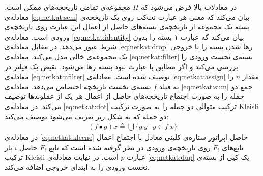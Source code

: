 \documentclass[
msc,
irfonts
]{./tex/tehran-thesis}
\newcommand{\پ}{پروژه/پایان‌نامه/رساله }
\theoremstyle{definition}
\theoremstyle{theorem}
\theoremstyle{definition}
\numberwithin{algorithm}{chapter}
\newcommand{\s}[1]{\{#1\}}
\newcommand{\lf}[1]{\LTRfootnote{#1}}
\begin{document}
در معادلات بالا فرض می‌شود که
$H$
مجموعه‌ی تمامی تاریخچه‌های ممکن است.
معادله‌ی
\ref{eq:netkat:sem}
بیان می‌کند که معنی هر عبارت نت‌کت روی یک تاریخچه‌ی بسته یک مجموعه از
تاریخچه‌ی بسته‌های حاصل از اعمال این عبارت روی تاریخچه‌ی ورودی است.
معادله‌ی
\ref{eq:netkat:identity}
بیان می‌کند که عبارت ۱ بسته را بدون شرط عبور می‌دهد.
در مقابل معادله‌ی
\ref{eq:netkat:drop}
رها شدن بسته را با خروجی یک مجموعه‌ی خالی مدل می‌کند.
معادله‌ی
\ref{eq:netkat:filter}
بسته‌ی نخست ورودی را بررسی می‌کند و اگر مطابق با عبارت نبود بسته رها می‌شود.
نقیض یک فیلتر در معادله‌ی
\ref{eq:netkat:nfilter}
توصیف شده است.
معادله‌ی
\ref{eq:netkat:assign}
مقدار
$n$
را به فیلد
$f$
بسته‌ی نخست تاریخچه اختصاص می‌دهد.
معادله‌ی
\ref{eq:netkat:sum}
جمع دو جمله را به صورت اجتماع تاریخچه‌های حاصل از اعمال هر یک از عملوند‌ها توصیف می‌کند.
در معادله‌ی
\ref{eq:netkat:dot}
ترکیب متوالی دو جمله را به صورت ترکیب
Kleisli
دو جمله که به شکل زیر تعریف می‌شود توصیف می‌کند:
\begin{align*}
    (f \bullet g) x \triangleq \bigcup \s{g\ y ~|~ y \in f\ x}
\end{align*}
در معادله‌ی
\ref{eq:netkat:kleene}
حاصل اپراتور ستاره‌ی کلینی\lf{Kleene Star}
معادل با اجتماع اعمال تابع‌های
$F_i$
روی تاریخچه‌ی ورودی در نظر گرفته شده است که تابع
$F_i$
حاصل
$i$
بار
ترکیب
Kleisli
عبارت
$p$
است.
در نهایت معادله‌ی
\ref{eq:netkat:dup}
یک کپی از بسته‌ی نخست ورودی را به ابتدای خروجی اضافه می‌کند.
\end{document}
